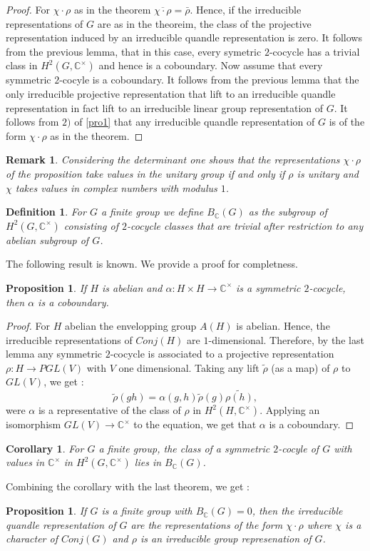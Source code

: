 \documentclass[12pt, reqno]{amsart}
\newtheorem{proposition}[theorem]{Proposition}
\newtheorem{definition}[theorem]{Definition}
\newtheorem{corollary}[theorem]{Corollary}
\newtheorem{remark}[theorem]{Remark}
\begin{document}
\begin{proof}
For $\chi \cdot \rho$ as in the theorem $\overline{\chi\cdot \rho}=\bar{\rho}$. Hence, if the irreducible representations of $G$ are as in the theoreim, the class of the projective representation induced by an irreducible quandle representation is zero. It follows from the previous lemma, that in this case, every symetric $2$-cocycle has a trivial class in $H^2(G,\mathbb{C}^\times)$ and hence is a coboundary. Now assume that every symmetric $2$-cocyle is a coboundary. It follows from the previous lemma that the only irreducible projective representation that lift to an irreducible quandle representation in fact lift to an irreducible linear group representation of $G$. It follows from $2)$ of \ref{pro1} that any irreducible quandle representation of $G$ is of the form $\chi \cdot \rho$ as in the theorem.
\end{proof}
\begin{remark}
Considering the determinant one shows that the representations $\chi \cdot \rho$ of the proposition take values in the unitary group if and only if $\rho$ is unitary and $\chi$ takes values in complex numbers with modulus $1$.
\end{remark}
\begin{definition}
For $G$ a finite group we define $B_\mathbb{C}(G)$ as the subgroup of $H^2(G,\mathbb{C}^\times)$ consisting of $2$-cocycle classes that are trivial after restriction to any abelian subgroup of $G$. 
\end{definition}
The following result is known. We provide a proof for completness.
\begin{proposition}
If $H$ is abelian and $\alpha :H\times H \to \mathbb{C}^\times$ is a symmetric $2$-cocycle, then $\alpha$ is a coboundary.
\end{proposition}
\begin{proof}
For $H$ abelian the envelopping group $A(H)$ is abelian. Hence, the irreducible representations of $Conj(H)$ are $1$-dimensional. Therefore, by the last lemma any symmetric $2$-cocycle is associated to a projective representation $\rho :H \to PGL(V)$ with $V$ one dimensional. Taking any lift $\tilde{\rho}$ (as a map) of $\rho$ to $GL(V)$, we get :
$$ \tilde{\rho}(gh)=\alpha(g,h) \tilde{\rho}(g)\tilde{\rho(h)},$$
were $\alpha$ is a representative of the class of $\rho$ in $H^2(H,\mathbb{C}^\times)$. Applying an isomorphism $GL(V)\to \mathbb{C}^\times$ to the equation, we get that $\alpha$ is a coboundary.  
\end{proof}
\begin{corollary}
For $G$ a finite group, the class of a symmetric $2$-cocyle of $G$ with values in $\mathbb{C}^\times$ in $H^2(G,\mathbb{C}^\times)$ lies in $B_\mathbb{C}(G)$.
\end{corollary}
Combining the corollary with the last theorem, we get : 
\begin{proposition}\label{fin}
If $G$ is a finite group with $B_\mathbb{C}(G)=0$, then the irreducible quandle representation of $G$ are the representations of the form $\chi\cdot \rho$ where $\chi$ is a character of $Conj(G)$ and $\rho$ is an irreducible group represenation of $G$. 
\end{proposition}
\end{document}

